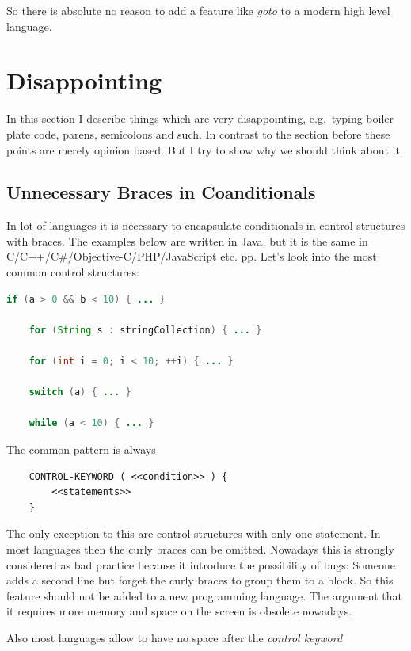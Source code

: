 \documentclass[11pt, a4paper]{report}
\begin{document}
So there is absolute no reason to add a feature like \textit{goto} to a modern high level language.

\section{Disappointing}

In this section I describe things which are very disappointing, e.g.\ typing boiler plate code, parens, semicolons and such. In contrast to the section before these points are merely opinion based. But I try to show why we should think about it.

\subsection{Unnecessary Braces in Coanditionals}

In lot of languages it is necessary to encapsulate conditionals in control structures with braces. The examples below are written in Java, but it is the same in C/C++/C\#/Objective-C/PHP/JavaScript etc. pp. Let's look into the most common control structures:

\begin{lstlisting}[language=Java]
    if (a > 0 && b < 10) { ... }
    
    for (String s : stringCollection) { ... }
    
    for (int i = 0; i < 10; ++i) { ... }
    
    switch (a) { ... }
    
    while (a < 10) { ... }
\end{lstlisting}

\noindent The common pattern is always

\begin{lstlisting}
    CONTROL-KEYWORD ( <<condition>> ) { 
        <<statements>> 
    }
\end{lstlisting}

The only exception to this are control structures with only one statement. In most languages then the curly braces can be omitted. Nowadays this is strongly considered as bad practice because it introduce the possibility of bugs: Someone adds a second line but forget the curly braces to group them to a block. So this feature should not be added to a new programming language. The argument that it requires more memory and space on the screen is obsolete nowadays.

Also most languages allow to have no space after the \textit{control keyword}
\end{document}
